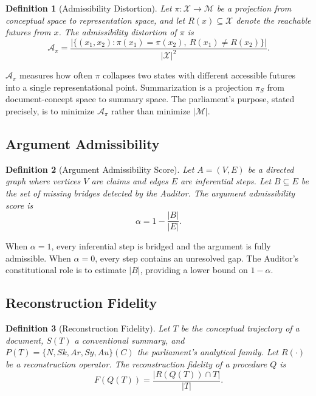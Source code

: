 \documentclass[12pt, a4paper]{article}
\newtheorem{definition}{Definition}[section]
\theoremstyle{principle}
\theoremstyle{definition}
\begin{document}
\begin{definition}[Admissibility Distortion]
Let $\pi : \mathcal{X} \to \mathcal{M}$ be a projection from conceptual space to
representation space, and let $R(x) \subseteq \mathcal{X}$ denote the reachable
futures from $x$. The \emph{admissibility distortion} of $\pi$ is
\[
\mathcal{A}_\pi =
\frac{\bigl|\{(x_1, x_2) : \pi(x_1) = \pi(x_2),\ R(x_1) \neq R(x_2)\}\bigr|}
{|\mathcal{X}|^2}.
\]
\end{definition}

$\mathcal{A}_\pi$ measures how often $\pi$ collapses two states with different
accessible futures into a single representational point. Summarization is a
projection $\pi_S$ from document-concept space to summary space. The parliament's
purpose, stated precisely, is to minimize $\mathcal{A}_\pi$ rather than
minimize $|\mathcal{M}|$.

\subsection{Argument Admissibility}

\begin{definition}[Argument Admissibility Score]
Let $A = (V, E)$ be a directed graph where vertices $V$ are claims and edges $E$
are inferential steps. Let $B \subseteq E$ be the set of missing bridges detected
by the Auditor. The \emph{argument admissibility score} is
\[
\alpha = 1 - \frac{|B|}{|E|}.
\]
\end{definition}

When $\alpha = 1$, every inferential step is bridged and the argument is fully
admissible. When $\alpha = 0$, every step contains an unresolved gap. The
Auditor's constitutional role is to estimate $|B|$, providing a lower bound on
$1 - \alpha$.

\subsection{Reconstruction Fidelity}

\begin{definition}[Reconstruction Fidelity]
Let $T$ be the conceptual trajectory of a document, $S(T)$ a conventional summary,
and $P(T) = \{N, Sk, Ar, Sy, Au\}(C)$ the parliament's analytical family.
Let $R(\cdot)$ be a reconstruction operator. The \emph{reconstruction fidelity}
of a procedure $Q$ is
\[
F(Q(T)) = \frac{|R(Q(T)) \cap T|}{|T|}.
\]
\end{definition}
\end{document}
